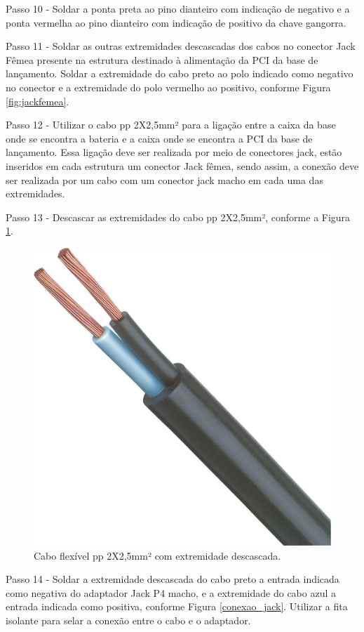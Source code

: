 Passo 10 - Soldar a ponta preta ao pino dianteiro com indicação de negativo e a ponta vermelha ao pino dianteiro com indicação de positivo da chave gangorra.

Passo 11 - Soldar as outras extremidades descascadas dos cabos no conector Jack Fêmea presente na estrutura destinado à alimentação da PCI da base de lançamento. Soldar a extremidade do cabo preto ao polo indicado como negativo no conector e a extremidade do polo vermelho ao positivo, conforme Figura \ref{fig:jackfemea}.

Passo 12 - Utilizar o cabo pp 2X2,5mm² para a ligação entre a caixa da base onde se encontra a bateria e a caixa onde se encontra a PCI da base de lançamento. Essa ligação deve ser realizada por meio de conectores jack, estão inseridos em cada estrutura um conector Jack fêmea, sendo assim, a conexão deve ser realizada por um cabo com um conector jack macho em cada uma das extremidades.

Passo 13 - Descascar as extremidades do cabo pp 2X2,5mm², conforme a Figura \ref{fig:cabopp}.

\begin{figure}[H]
  \centering
  \includegraphics[keepaspectratio=true,scale=0.15] {Figuras/BASE/energiabase/cabopp.jpg}
  \caption{Cabo flexível pp 2X2,5mm² com extremidade descascada.} 
  \label{fig:cabopp}
\end{figure}
Passo 14 - Soldar a extremidade descascada do cabo preto a entrada indicada como negativa do adaptador Jack P4 macho, e a extremidade do cabo azul a entrada indicada como positiva, conforme Figura \ref{conexao_jack}. Utilizar a fita isolante para selar a conexão entre o cabo e o adaptador.

